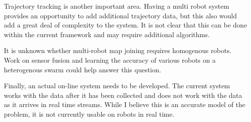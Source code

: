 \documentclass[12pt]{report}
\begin{document}
Trajectory tracking is another important area.  Having a multi robot system provides an opportunity to add additional trajectory data, but this also would add a great deal of complexity to the system.  It is not clear that this can be done within the current framework and may require additional algorithms.  

It is unknown whether multi-robot map joining requires homogenous robots.  Work on sensor fusion and learning the accuracy of various robots on a heterogenous swarm could help answer this question.

Finally, an actual on-line system needs to be developed.  The current system works with the data after it has been collected and does not work with the data as it arrives in real time streams.  While I believe this is an accurate model of the problem, it is not currently usable on robots in real time.
\end{document}
